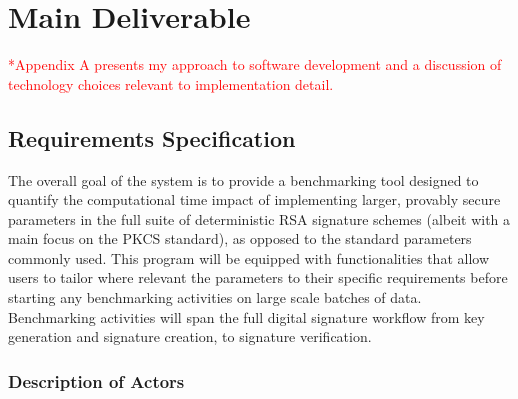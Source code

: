 \documentclass[]{final_report}
\theoremstyle{definition}
\begin{document}
\chapter{Main Deliverable}



\textcolor{red}{*Appendix A presents my approach to software development and a discussion of technology choices relevant to implementation detail.}



\section{Requirements Specification}
The overall goal of the system is to provide a benchmarking tool designed to quantify the computational time impact of implementing larger, provably secure parameters in the full suite of deterministic RSA signature schemes (albeit with a main focus on the PKCS standard), as opposed to the standard parameters commonly used. This program will be equipped with functionalities that allow users to tailor where relevant the parameters to their specific requirements before starting any benchmarking activities on large scale batches of data. Benchmarking activities will span the full digital signature workflow from key generation and signature creation, to signature verification.
\subsection{Description of Actors}
\end{document}
